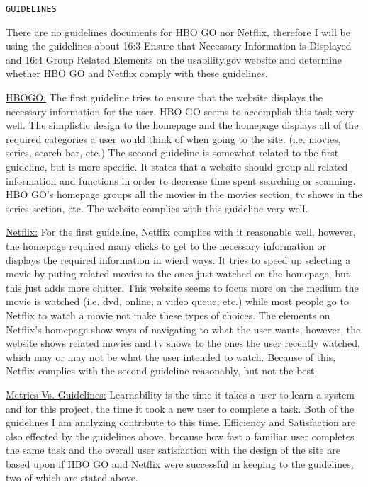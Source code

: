 \documentclass[11pt]{article}
\begin{document}
\begin{verbatim}
GUIDELINES
\end{verbatim}
There are no guidelines documents for HBO GO nor Netflix, therefore I will be using the guidelines about 16:3 Ensure that Necessary Information is Displayed and 16:4 Group Related Elements on the usability.gov website and determine whether HBO GO and Netflix comply with these guidelines.

\underline{HBOGO:}
 The first guideline tries to ensure that the website displays the necessary information for the user. HBO GO seems to accomplish this task very well. The simplistic design to the homepage and the homepage displays all of the required categories a user would think of when going to the site. (i.e. movies, series, search bar, etc.) The second guideline is somewhat related to the first guideline, but is more specific. It states that a website should group all related information and functions in order to decrease time spent searching or scanning. HBO GO's homepage groups all the movies in the movies section, tv shows in the series section, etc. The website complies with this guideline very well.

\underline{Netflix:}
For the first guideline, Netflix complies with it reasonable well, however, the homepage required many clicks to get to the necessary information or displays the required information in wierd ways. It tries to speed up selecting a movie by puting related movies to the ones just watched on the homepage, but this just adds more clutter. This website seems to focus more on the medium the movie is watched (i.e. dvd, online, a video queue, etc.) while most people go to Netflix to watch a movie not make these types of choices.
The elements on Netflix's homepage show ways of navigating to what the user wants, however, the website shows related movies and tv shows to the ones the user recently watched, which may or may not be what the user intended to watch. Because of this, Netflix complies with the second guideline reasonably, but not the best.

\underline{Metrics Vs. Guidelines:}
Learnability is the time it takes a user to learn a system and for this project, the time it took a new user to complete a task. Both of the guidelines I am analyzing contribute to this time. Efficiency and Satisfaction are also effected by the guidelines above, because how fast a familiar user completes the same task and the overall user satisfaction with the design of the site are based upon if HBO GO and Netflix were successful in keeping to the guidelines, two of which are stated above.
\end{document}
